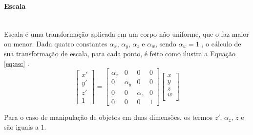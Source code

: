 \paragraph{Escala} \mbox{}\\
Escala é uma transformação aplicada em um corpo não uniforme, que o faz maior ou menor. Dada quatro constantes $\alpha_x$, $\alpha_y$, $\alpha_z$ e $\alpha_w$, sendo $\alpha_w = 1$ , o cálculo de sua transformação de escala, para cada ponto, é feito como ilustra a Equação \ref{eq:esc} \cite{opengl8th}.
\begin{equation} \label{eq:esc}
  \begin{bmatrix}
      x'\\ 
      y' \\
      z' \\
      1
    \end{bmatrix} 
    = 
    \begin{bmatrix}
     \alpha_x& 0 & 0 & 0 \\ 
     0 & \alpha_y & 0 & 0\\ 
     0& 0 & \alpha_z & 0\\ 
     0& 0 & 0 & 1
  \end{bmatrix}
  \begin{bmatrix}
      x\\ 
      y\\
      z\\
      w\\
    \end{bmatrix}
\end{equation}

Para o caso de manipulação de objetos em duas dimensões, os termos $z'$, $\alpha_z$, $z$ e são iguais a $1$.
  
